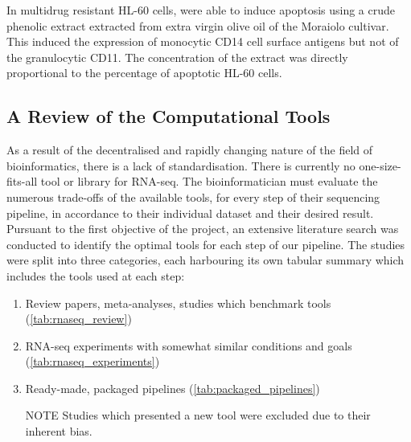 In multidrug resistant HL-60 cells, \cite{crescimanno2009effects} were able to induce apoptosis using a crude phenolic extract extracted from extra virgin olive oil of the Moraiolo cultivar. This induced the expression of monocytic CD14 cell surface antigens but not of the granulocytic CD11. The concentration of the extract was directly proportional to the percentage of apoptotic HL-60 cells. 





\subsection{A Review of the Computational Tools}
As a result of the decentralised and rapidly changing nature of the field of bioinformatics, there is a lack of standardisation. There is currently no one-size-fits-all tool or library for RNA-seq. The bioinformatician must evaluate the numerous trade-offs of the available tools, for every step of their sequencing pipeline, in accordance to their individual dataset and their desired result. Pursuant to the first objective of the project, an extensive literature search was conducted to identify the optimal tools for each step of our pipeline. The studies were split into three categories, each harbouring its own tabular summary which includes the tools used at each step:

\begin{enumerate}
\item Review papers, meta-analyses, studies which benchmark tools (\autoref{tab:rnaseq_review})
\item RNA-seq experiments with somewhat similar conditions and goals (\autoref{tab:rnaseq_experiments})
\item Ready-made, packaged pipelines (\autoref{tab:packaged_pipelines})
\item[NOTE] Studies which presented a new tool were excluded due to their inherent bias.
\end{enumerate}

